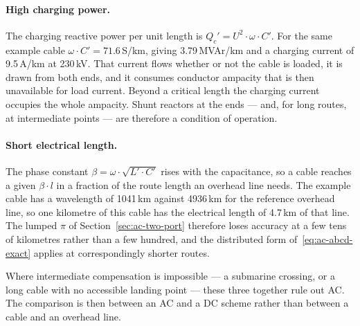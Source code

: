 \paragraph{High charging power.} The charging reactive power per
unit length is $Q_c' = U^2 \cdot \omega \cdot C'$. For the same example
cable $\omega \cdot C' = 71.6$\,\textmu S/km, giving 3.79\,MVAr/km and a
charging current of 9.5\,A/km at 230\,kV. That current flows whether or not
the cable is loaded, it is drawn from both ends, and it consumes conductor
ampacity that is then unavailable for load current. Beyond a critical length
the charging current occupies the whole ampacity. Shunt reactors at
the ends --- and, for long routes, at intermediate points --- are therefore a
condition of operation.

\paragraph{Short electrical length.} The phase constant
$\beta = \omega \cdot \sqrt{L' \cdot C'}$ rises with the capacitance, so a
cable reaches a given $\beta \cdot l$ in a fraction of the route length an
overhead line needs. The example cable has a wavelength of 1041\,km against
4936\,km for the reference overhead line, so one kilometre of this cable has
the electrical length of 4.7\,km of that line. The lumped $\pi$ of
Section~\ref{sec:ac-two-port} therefore loses accuracy at a few tens of
kilometres rather than a few hundred, and the distributed form
of~\eqref{eq:ac-abcd-exact} applies at correspondingly shorter routes.

Where intermediate compensation is impossible --- a submarine crossing, or a
long cable with no accessible landing point --- these three together rule
out AC. The comparison is then between an AC and a DC scheme rather than
between a cable and an overhead line.

\FloatBarrier
